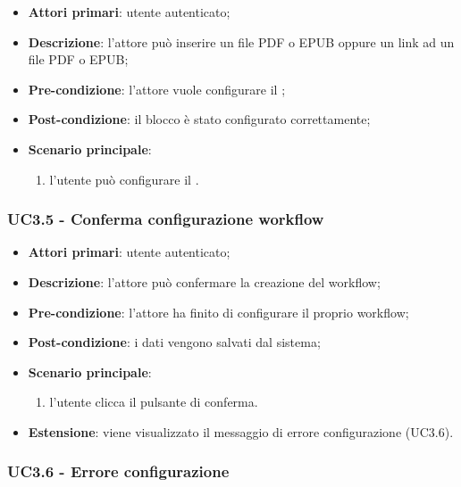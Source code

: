 \begin{itemize}
\item \textbf{Attori primari}: utente autenticato;

\item \textbf{Descrizione}: l'attore può inserire un file PDF o EPUB oppure un link ad un file PDF o EPUB;

\item \textbf{Pre-condizione}: l'attore vuole configurare il \BKindle{};

\item \textbf{Post-condizione}:  il blocco è stato configurato correttamente;

\item \textbf{Scenario principale}:
\begin{enumerate}
\item  l'utente può configurare il \BKindle{}.

\end{enumerate}
\end{itemize}

\subsubsection{UC3.5 - Conferma configurazione workflow}

\begin{itemize}
\item \textbf{Attori primari}: utente autenticato;

\item \textbf{Descrizione}: l'attore può confermare la creazione del workflow;

\item \textbf{Pre-condizione}: l'attore ha finito di configurare il proprio workflow;

\item \textbf{Post-condizione}: i dati vengono salvati dal sistema;

\item \textbf{Scenario principale}:
\begin{enumerate}
\item l'utente clicca il pulsante di conferma.
\end{enumerate}
\item \textbf{Estensione}: viene visualizzato il messaggio di errore configurazione (UC3.6).
\end{itemize}

\subsubsection{UC3.6 - Errore configurazione}


